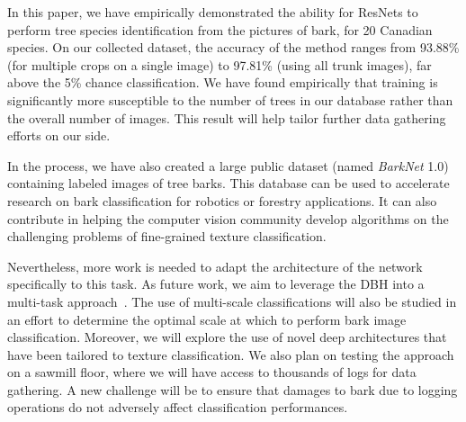 \documentclass[letterpaper, 10 pt, conference]{ieeeconf}  %
\begin{document}
In this paper, we have empirically demonstrated the ability for ResNets to perform tree species identification from the pictures of bark, for 20 Canadian species. On our collected dataset, the accuracy of the method ranges from 93.88\% (for multiple crops on a single image) to 97.81\% (using all trunk images), far above the 5\% chance classification. We have found empirically that training is significantly more susceptible to the number of trees in our database rather than the overall number of images. This result will help tailor further data gathering efforts on our side.

In the process, we have also created a large public dataset (named \emph{BarkNet} 1.0) containing labeled images of tree barks. This database can be used to accelerate research on bark classification for robotics or forestry applications. It can also contribute in helping the computer vision community develop algorithms on the challenging problems of fine-grained texture classification.

Nevertheless, more work is needed to adapt the architecture of the network specifically to this task. As future work, we aim to leverage the DBH into a multi-task approach~\cite{Trottier2017}. The use of multi-scale classifications will also be studied in an effort to determine the optimal scale at which to perform bark image classification. Moreover, we will explore the use of novel deep architectures that have been tailored to texture classification. We also plan on testing the approach on a sawmill floor, where we will have access to thousands of logs for data gathering. A new challenge will be to ensure that damages to bark due to logging operations do not adversely affect classification performances.

\addtolength{\textheight}{-8.4cm}   %

\end{document}
